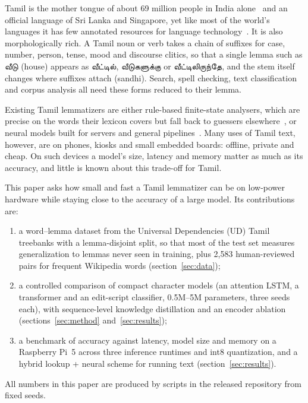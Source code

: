 \documentclass{sadhana}
\newcommand{\ta}[1]{{\tamilfont #1}}
\begin{document}
Tamil is the mother tongue of about 69 million people in India
alone~\cite{census2011} and an official language of Sri Lanka and Singapore,
yet like most of the world's languages it has few annotated resources for
language technology~\cite{joshi2020}. It is also
morphologically rich. A Tamil noun or verb takes a chain of suffixes for case,
number, person, tense, mood and discourse clitics, so that a single lemma such
as \ta{வீடு} (house) appears as \ta{வீட்டில்}, \ta{வீடுகளுக்கு} or
\ta{வீட்டிலிருந்தே}, and the stem itself changes where suffixes attach
(sandhi). Search, spell checking, text classification and corpus analysis all
need these forms reduced to their lemma.

Existing Tamil lemmatizers are either rule-based finite-state analysers, which
are precise on the words their lexicon covers but fall back to guessers
elsewhere~\cite{thamizhimorph}, or neural models built for servers and general
pipelines~\cite{stanza, tamillemmapkg}. Many uses of Tamil text, however, are
on phones, kiosks and small embedded boards: offline, private and cheap. On such
devices a model's size, latency and memory matter as much as its accuracy, and
little is known about this trade-off for Tamil.

This paper asks how small and fast a Tamil lemmatizer can be on low-power
hardware while staying close to the accuracy of a large model. Its
contributions are:
\begin{enumerate}
\item a word--lemma dataset from the Universal Dependencies (UD) Tamil
  treebanks with a lemma-disjoint split, so that most of the test set measures
  generalization to lemmas never seen in training, plus 2,583 human-reviewed
  pairs for frequent Wikipedia words (section~\ref{sec:data});
\item a controlled comparison of compact character models (an attention LSTM,
  a transformer and an edit-script classifier, 0.5M--5M parameters, three seeds
  each), with sequence-level knowledge distillation and an encoder ablation
  (sections~\ref{sec:method} and~\ref{sec:results});
\item a benchmark of accuracy against latency, model size and memory on a
  Raspberry Pi~5 across three inference runtimes and int8 quantization, and a
  hybrid lookup + neural scheme for running text (section~\ref{sec:results}).
\end{enumerate}
All numbers in this paper are produced by scripts in the released repository
from fixed seeds.
\end{document}
